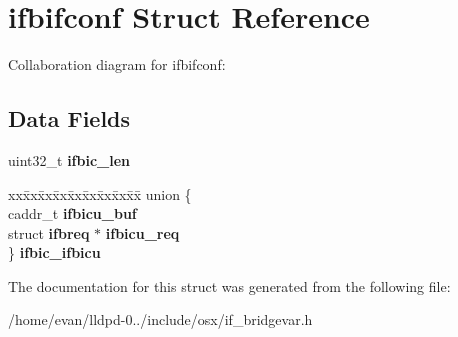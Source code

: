 \section{ifbifconf \-Struct \-Reference}
\label{structifbifconf}


\-Collaboration diagram for ifbifconf\-:
\subsection*{\-Data \-Fields}
\begin{DoxyCompactItemize}
\item 
uint32\-\_\-t {\bfseries ifbic\-\_\-len}\label{structifbifconf_a80d72a1d69d0bfb0a9f63221e884b89a}

\item 
\begin{tabbing}
xx\=xx\=xx\=xx\=xx\=xx\=xx\=xx\=xx\=\kill
union \{\\
\>caddr\_t {\bfseries ifbicu\_buf}\\
\>struct {\bf ifbreq} $\ast$ {\bfseries ifbicu\_req}\\
\} {\bfseries ifbic\_ifbicu}\label{structifbifconf_ad61a0ab2703957112fad8f36bc01a8cc}
\\

\end{tabbing}\end{DoxyCompactItemize}


\-The documentation for this struct was generated from the following file\-:\begin{DoxyCompactItemize}
\item 
/home/evan/lldpd-\/0../include/osx/if\-\_\-bridgevar.\-h\end{DoxyCompactItemize}

